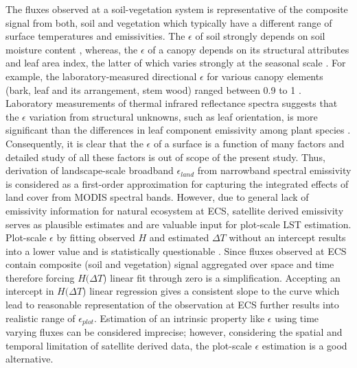 \documentclass[fleqn,10pt]{wlscirep}
\begin{document}
The fluxes observed at a soil-vegetation system is representative of the composite signal from both, soil and vegetation which typically have a different range of surface temperatures and emissivities\cite{jin_improved_2006-1}. The $\epsilon$ of soil strongly depends on soil moisture content \cite{mira2007influence}, whereas, the $\epsilon$ of a canopy depends on its structural attributes and leaf area index, the latter of which varies strongly at the seasonal scale \cite{chen2015determining}. For example, the laboratory-measured directional $\epsilon$ for various canopy elements (bark, leaf and its arrangement, stem wood) ranged between 0.9 to 1 \cite{vishnevetsky2019method}. %
Laboratory measurements of thermal infrared reflectance spectra suggests that the $\epsilon$ variation from structural unknowns, such as leaf orientation, is more significant than the differences in leaf component emissivity among plant species \cite{snyder1998classification}. Consequently, it is clear that the $\epsilon$ of a surface is a function of many factors and detailed study of all these factors is out of scope of the present study. Thus, derivation of landscape-scale broadband $\epsilon_{land}$ from narrowband spectral emissivity is considered as a first-order approximation for capturing the integrated effects of land cover from MODIS spectral bands\cite{jin_improved_2006-1}. However, due to general lack of emissivity information for natural ecosystem at ECS, satellite derived emissivity serves as plausible estimates and are valuable input for plot-scale LST estimation. Plot-scale $\epsilon$ by fitting observed $H$ and estimated $\Delta T$ without an intercept results into a lower value and is statistically questionable \cite{eisenhauer2003regression}. Since fluxes observed at ECS contain composite (soil and vegetation) signal aggregated over space and time therefore forcing $H(\Delta T$) linear fit through zero is a simplification. Accepting an intercept in $H(\Delta T$) linear regression gives a consistent slope to the curve which lead to reasonable representation of the observation at ECS further results into realistic range of $\epsilon_{plot}$. Estimation of an intrinsic property like $\epsilon$ using time varying fluxes can be considered imprecise; however, considering the spatial and temporal limitation of satellite derived data, the plot-scale $\epsilon$ estimation is a good alternative.
\end{document}
